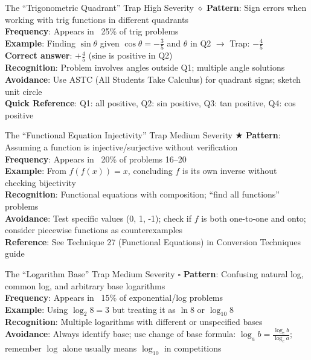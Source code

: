 \documentclass{article}
\begin{document}
\begin{trapbox}{The ``Trigonometric Quadrant'' Trap \colorbox{red!20}{High Severity} $\diamond$}
\textbf{Pattern}: Sign errors when working with trig functions in different quadrants\\
\textbf{Frequency}: Appears in ~25\% of trig problems\\
\textbf{Example}: Finding $\sin\theta$ given $\cos\theta = -\frac{3}{5}$ and $\theta$ in Q2 $\rightarrow$ Trap: $-\frac{4}{5}$\\
\textbf{Correct answer}: $+\frac{4}{5}$ (sine is positive in Q2)\\
\textbf{Recognition}: Problem involves angles outside Q1; multiple angle solutions\\
\textbf{Avoidance}: Use ASTC (All Students Take Calculus) for quadrant signs; sketch unit circle\\
\textbf{Quick Reference}: Q1: all positive, Q2: sin positive, Q3: tan positive, Q4: cos positive
\end{trapbox}

\begin{trapbox}{The ``Functional Equation Injectivity'' Trap \colorbox{orange!20}{Medium Severity} $\bigstar$}
\textbf{Pattern}: Assuming a function is injective/surjective without verification\\
\textbf{Frequency}: Appears in ~20\% of problems 16--20\\
\textbf{Example}: From $f(f(x)) = x$, concluding $f$ is its own inverse without checking bijectivity\\
\textbf{Recognition}: Functional equations with composition; ``find all functions'' problems\\
\textbf{Avoidance}: Test specific values (0, 1, -1); check if $f$ is both one-to-one and onto; consider piecewise functions as counterexamples\\
\textbf{Reference}: See Technique 27 (Functional Equations) in Conversion Techniques guide
\end{trapbox}

\begin{trapbox}{The ``Logarithm Base'' Trap \colorbox{orange!20}{Medium Severity} $\square$}
\textbf{Pattern}: Confusing natural log, common log, and arbitrary base logarithms\\
\textbf{Frequency}: Appears in ~15\% of exponential/log problems\\
\textbf{Example}: Using $\log_2 8 = 3$ but treating it as $\ln 8$ or $\log_{10} 8$\\
\textbf{Recognition}: Multiple logarithms with different or unspecified bases\\
\textbf{Avoidance}: Always identify base; use change of base formula: $\log_a b = \frac{\log_c b}{\log_c a}$; remember $\log$ alone usually means $\log_{10}$ in competitions
\end{trapbox}
\end{document}
